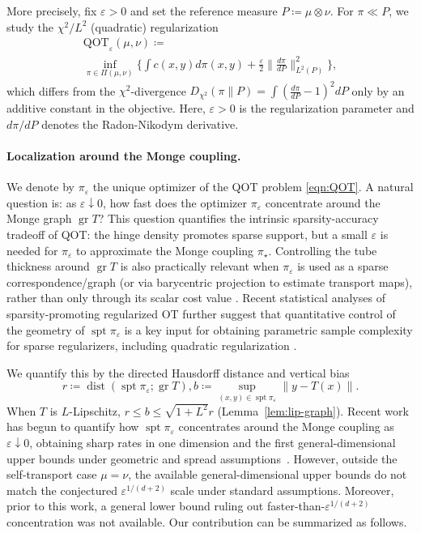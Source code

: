 \documentclass{article}
\theoremstyle{plain}
\theoremstyle{definition}
\theoremstyle{remark}
\numberwithin{equation}{section}
\DeclareMathOperator{\spt}{spt}
\DeclareMathOperator{\gr}{gr}
\DeclareMathOperator{\dist}{dist}
\newcommand{\QOT}{\mathrm{QOT}}
\begin{document}
More precisely, fix $\varepsilon>0$ and set the reference measure $P\coloneqq\mu\otimes\nu$.
For $\pi\ll P$, we study the $\chi^2/L^2$ (quadratic) regularization
\begin{multline}\label{eqn:QOT}
\QOT_\varepsilon(\mu,\nu)\coloneqq \\
\inf_{\pi\in\Pi(\mu,\nu)}\Big\{\int c(x,y)d\pi(x,y)+\frac{\varepsilon}{2}\Big\|\frac{d\pi}{dP}\Big\|_{L^2(P)}^2\Big\},
\end{multline}
which differs from the $\chi^2$-divergence $D_{\chi^2}(\pi\|P)=\int(\frac{d\pi}{dP}-1)^2dP$ only by an additive constant in the objective.
Here, $\varepsilon>0$ is the regularization parameter and $d\pi/dP$ denotes the Radon-Nikodym derivative.
\paragraph{Localization around the Monge coupling.}
We denote by $\pi_\varepsilon$ the unique optimizer of the QOT problem \eqref{eqn:QOT}.
A natural question is: as $\varepsilon\downarrow0$, how fast does the optimizer $\pi_\varepsilon$ concentrate around the Monge graph $\gr T$?
This question quantifies the intrinsic sparsity-accuracy tradeoff of QOT: the hinge density promotes sparse support, but a small $\varepsilon$ is needed for $\pi_\varepsilon$ to approximate the Monge coupling $\pi_\star$.
Controlling the tube thickness around $\gr T$ is also practically relevant when $\pi_\varepsilon$ is used as a sparse correspondence/graph (or via barycentric projection to estimate transport maps), rather than only through its scalar cost value \citep{matsumoto2022beyond,pooladian2021entropic}.
Recent statistical analyses of sparsity-promoting regularized OT further suggest that quantitative control of the geometry of $\spt\pi_\varepsilon$ is a key input for obtaining parametric sample complexity for sparse regularizers, including quadratic regularization \citep{gonzalez2025sample,gonzalez2025sparse}.


We quantify this by the directed Hausdorff distance and vertical bias
$$
r\coloneqq\dist(\spt\pi_\varepsilon;\gr T),b\coloneqq\sup_{(x,y)\in\spt\pi_\varepsilon}\|y-T(x)\|.
$$
When $T$ is $L$-Lipschitz, $r\le b\le\sqrt{1+L^2}r$ (Lemma~\ref{lem:lip-graph}).
Recent work has begun to quantify how $\spt\pi_\varepsilon$ concentrates around the Monge coupling as $\varepsilon\downarrow0$, obtaining sharp rates in one dimension and the first general-dimensional upper bounds under geometric and spread assumptions~\citep{gonzalez2024sparsity, wiesel2025sparsity,gvalani2026sparsity}.
However, outside the self-transport case $\mu=\nu$, the available general-dimensional upper bounds do not match the conjectured $\varepsilon^{1/(d+2)}$ scale under standard assumptions.
Moreover, prior to this work, a general lower bound ruling out faster-than-$\varepsilon^{1/(d+2)}$ concentration was not available.
Our contribution can be summarized as follows.
\end{document}
